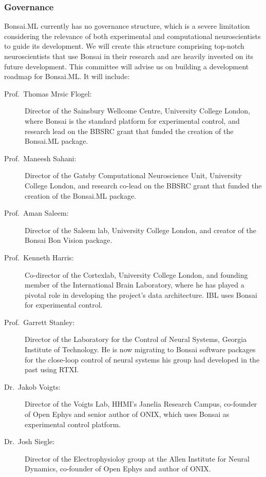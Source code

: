 \subsubsection*{Governance}

Bonsai.ML currently has no governance structure, which is a severe limitation
considering the relevance of both experimental and computational
neuroscientists to guide its development.
%
We will create this structure comprising top-notch neuroscientists that use
Bonsai in their research and are heavily invested on its future development.
%
This committee will advise us on building a development roadmap for Bonsai.ML.
It will include:

\begin{description}

    \item[Prof.~Thomas Mrsic Flogel:] Director of the Sainsbury Wellcome
        Centre, University College London, where Bonsai is the standard
        platform for experimental control, and research lead on the BBSRC grant
        that funded the creation of the Bonsai.ML package.

    \item[Prof.~Maneesh Sahani:] Director of the Gatsby Computational
        Neuroscience Unit, University College London, and research co-lead on
        the BBSRC grant that funded the creation of the Bonsai.ML package.

    \item[Prof.~Aman Saleem:] Director of the Saleem lab, University College
        London, and creator of the Bonsai Bon Vision package.

    \item[Prof.~Kenneth Harris:] Co-director of the Cortexlab, University
        College London, and founding member of the International Brain
        Laboratory, where he has played a pivotal role in developing the
        project's data architecture. IBL uses Bonsai for experimental control.

    \item[Prof.~Garrett Stanley:] Director of the Laboratory for the Control of
        Neural Systems, Georgia Institute of Technology. He is now migrating to
        Bonsai software packages for the close-loop control of neural systems
        his group had developed in the past using RTXI.

    \item[Dr.~Jakob Voigts:] Director of the Voigts Lab, HHMI's Janelia
        Research Campus, co-founder of Open Ephys and senior author of ONIX,
        which uses Bonsai as experimental control platform.

    \item[Dr.~Josh Siegle:] Director of the Electrophysioloy group at the Allen
        Institute for Neural Dynamics, co-founder of Open Ephys and author of
        ONIX.
        
\end{description}
